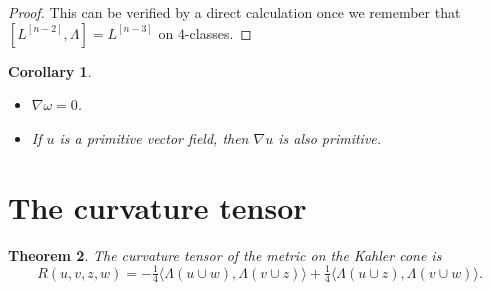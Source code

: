 \documentclass[11pt,a4paper]{amsart}
\newtheorem{theo}{Theorem}[section]
\newtheorem{coro}[theo]{Corollary}
\theoremstyle{definition}
\theoremstyle{remark}
\def\onfo{\tfrac14}
\def\levi{\nabla}
\def\kf{\omega}
\def\Lef{\Lambda}
\def\ton{u}
\def\ttw{v}
\def\tth{z}
\def\tfo{w}
\def\^#1{^{[#1]}}
\begin{document}
\begin{proof}
This can be verified by a direct calculation once we remember that
$[L\^{n-2},\Lef] = L\^{n-3}$ on $4$-classes.
\end{proof}


\begin{coro}
\label{coro:kahlerform}
\begin{itemize}
    \item 
$\levi \kf = 0$.
    \item 
If $\ton$ is a primitive vector field, then $\levi \ton$ is also
primitive.
\end{itemize}
\end{coro}






\section{The curvature tensor}



\begin{theo}
\label{theo:curvature}
The curvature tensor of the metric on the Kahler cone is
\begin{equation*}
R(\ton,\ttw,\tth,\tfo)
= 
- \onfo \langle \Lef(\ton \cup \tfo), \Lef(\ttw \cup \tth) \rangle
+ \onfo \langle \Lef(\ton \cup \tth), \Lef(\ttw \cup \tfo) \rangle.
\end{equation*}
\end{theo}
\end{document}
